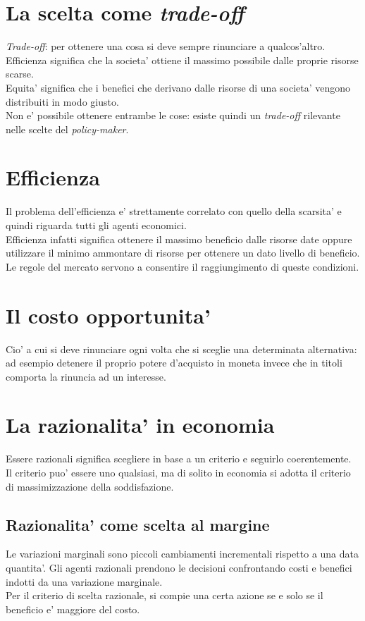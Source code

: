 \documentclass{report}
\begin{document}
	\section{La scelta come \textit{trade-off}}
	\textit{Trade-off}: per ottenere una cosa si deve sempre rinunciare a qualcos'altro.\\Efficienza significa che la societa' ottiene il massimo possibile dalle proprie risorse scarse.\\Equita' significa che i benefici che derivano dalle risorse di una societa' vengono distribuiti in modo giusto.\\Non e' possibile ottenere entrambe le cose: esiste quindi un \textit{trade-off} rilevante nelle scelte del \textit{policy-maker}.
	\section{Efficienza}
	Il problema dell'efficienza e' strettamente correlato con quello della scarsita' e quindi riguarda tutti gli agenti economici.\\Efficienza infatti significa ottenere il massimo beneficio dalle risorse date oppure utilizzare il minimo ammontare di risorse per ottenere un dato livello di beneficio.\\Le regole del mercato servono a consentire il raggiungimento di queste condizioni.
	\section{Il costo opportunita'}
	Cio' a cui si deve rinunciare ogni volta che si sceglie una determinata alternativa: ad esempio detenere il proprio potere d'acquisto in moneta invece che in titoli comporta la rinuncia ad un interesse.
	\section{La razionalita' in economia}
	Essere razionali significa scegliere in base a un criterio e seguirlo coerentemente. Il criterio puo' essere uno qualsiasi, ma di solito in economia si adotta il criterio di massimizzazione della soddisfazione.
	\subsection{Razionalita' come scelta al margine}
	Le variazioni marginali sono piccoli cambiamenti incrementali rispetto a una data quantita'. Gli agenti razionali prendono le decisioni confrontando costi e benefici indotti da una variazione marginale.\\Per il criterio di scelta razionale, si compie una certa azione se e solo se il beneficio e' maggiore del costo.
\end{document}
